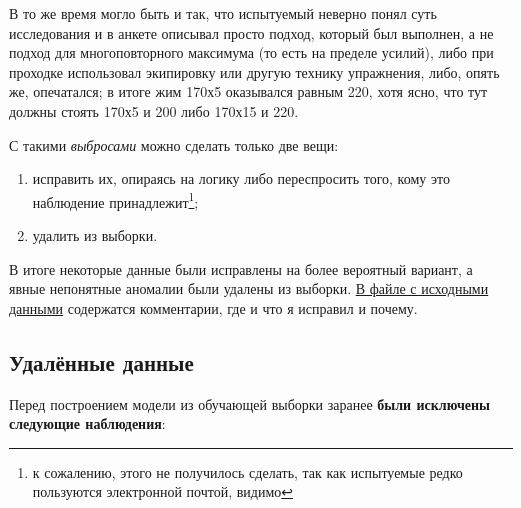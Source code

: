 \documentclass[
]{article}
\providecommand{\tightlist}{%
  \setlength{\itemsep}{0pt}\setlength{\parskip}{0pt}}
\begin{document}
В то же время могло быть и так, что испытуемый неверно понял суть
исследования и в анкете описывал просто подход, который был выполнен, а
не подход для многоповторного максимума (то есть на пределе усилий),
либо при проходке использовал экипировку или другую технику упражнения,
либо, опять же, опечатался; в итоге жим 170х5 оказывался равным 220,
хотя ясно, что тут должны стоять 170х5 и 200 либо 170х15 и 220.

С такими \emph{выбросами} можно сделать только две вещи:

\begin{enumerate}
\def\labelenumi{\arabic{enumi}.}
\tightlist
\item
  исправить их, опираясь на логику либо переспросить того, кому это
  наблюдение принадлежит\footnote{к сожалению, этого не получилось
    сделать, так как испытуемые редко пользуются электронной почтой,
    видимо};
\item
  удалить из выборки.
\end{enumerate}

В итоге некоторые данные были исправлены на более вероятный вариант, а
явные непонятные аномалии были удалены из выборки.
\href{https://github.com/PasaOpasen/Powerlifting-training-diary-and-articles/blob/master/Estimating\%20RM/data.tsv}{В
файле с исходными данными} содержатся комментарии, где и что я исправил
и почему.

\hypertarget{ux443ux434ux430ux43bux451ux43dux43dux44bux435-ux434ux430ux43dux43dux44bux435}{%
\subsection{Удалённые
данные}\label{ux443ux434ux430ux43bux451ux43dux43dux44bux435-ux434ux430ux43dux43dux44bux435}}

Перед построением модели из обучающей выборки заранее \textbf{были
исключены следующие наблюдения}:
\end{document}
